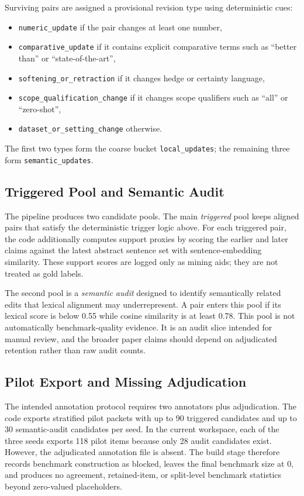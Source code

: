 \documentclass{article}
\begin{document}
Surviving pairs are assigned a provisional revision type using deterministic cues:
\begin{itemize}[leftmargin=*]
  \item \texttt{numeric\_update} if the pair changes at least one number,
  \item \texttt{comparative\_update} if it contains explicit comparative terms such as ``better than'' or ``state-of-the-art'',
  \item \texttt{softening\_or\_retraction} if it changes hedge or certainty language,
  \item \texttt{scope\_qualification\_change} if it changes scope qualifiers such as ``all'' or ``zero-shot'',
  \item \texttt{dataset\_or\_setting\_change} otherwise.
\end{itemize}
The first two types form the coarse bucket \texttt{local\_updates}; the remaining three form \texttt{semantic\_updates}.

\subsection{Triggered Pool and Semantic Audit}

The pipeline produces two candidate pools. The main \emph{triggered} pool keeps aligned pairs that satisfy the deterministic trigger logic above. For each triggered pair, the code additionally computes support proxies by scoring the earlier and later claims against the latest abstract sentence set with sentence-embedding similarity. These support scores are logged only as mining aids; they are not treated as gold labels.

The second pool is a \emph{semantic audit} designed to identify semantically related edits that lexical alignment may underrepresent. A pair enters this pool if its lexical score is below 0.55 while cosine similarity is at least 0.78. This pool is not automatically benchmark-quality evidence. It is an audit slice intended for manual review, and the broader paper claims should depend on adjudicated retention rather than raw audit counts.

\subsection{Pilot Export and Missing Adjudication}

The intended annotation protocol requires two annotators plus adjudication. The code exports stratified pilot packets with up to 90 triggered candidates and up to 30 semantic-audit candidates per seed. In the current workspace, each of the three seeds exports 118 pilot items because only 28 audit candidates exist. However, the adjudicated annotation file is absent. The build stage therefore records benchmark construction as blocked, leaves the final benchmark size at 0, and produces no agreement, retained-item, or split-level benchmark statistics beyond zero-valued placeholders.
\end{document}
